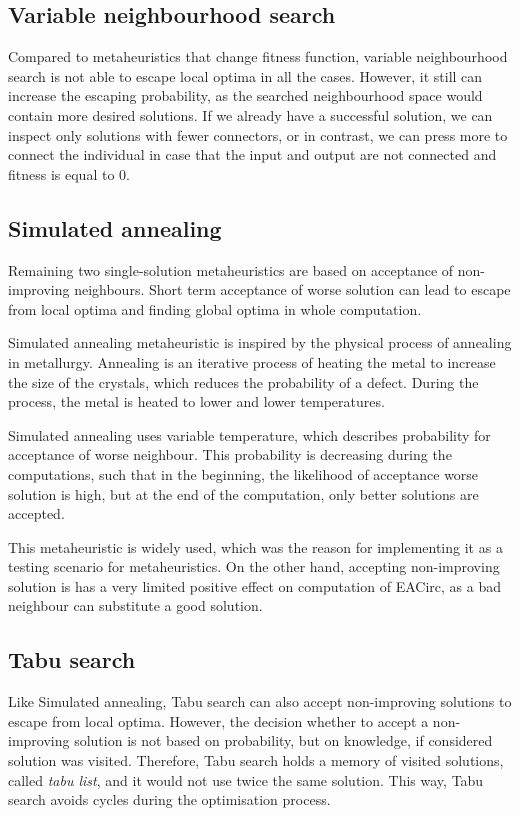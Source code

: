 \documentclass[
  print, %
  Table,   %
  nolof,     %
  nolot,     %
  11pt, %
  oneside  %
]{fithesis3}
\begin{document}
\subsection{Variable neighbourhood search}

Compared to metaheuristics that change fitness function, variable neighbourhood search is not able to escape local optima in all the cases. However, it still can increase the escaping probability, as the searched neighbourhood space would contain more desired solutions. If we already have a successful solution, we can inspect only solutions with fewer connectors, or in contrast, we can press more to connect the individual in case that the input and output are not connected and fitness is equal to 0.

\subsection{Simulated annealing}

Remaining two single-solution metaheuristics are based on acceptance of non-improving neighbours. Short term acceptance of worse solution can lead to escape from local optima and finding global optima in whole computation.

Simulated annealing metaheuristic is inspired by the physical process of annealing in metallurgy. Annealing is an iterative process of heating the metal to increase the size of the crystals, which reduces the probability of a defect. During the process, the metal is heated to lower and lower temperatures.

Simulated annealing uses variable temperature, which describes probability for acceptance of worse neighbour. This probability is decreasing during the computations, such that in the beginning, the likelihood of acceptance worse solution is high, but at the end of the computation, only better solutions are accepted.

This metaheuristic is widely used, which was the reason for implementing it as a testing scenario for metaheuristics. On the other hand, accepting non-improving solution is has a very limited positive effect on computation of EACirc, as a bad neighbour can substitute a good solution.

\subsection{Tabu search}

Like Simulated annealing, Tabu search can also accept non-improving solutions to escape from local optima. However, the decision whether to accept a non-improving solution is not based on probability, but on knowledge, if considered solution was visited. Therefore, Tabu search holds a memory of visited solutions, called \textit{tabu list}, and it would not use twice the same solution. This way, Tabu search avoids cycles during the optimisation process.
\end{document}
